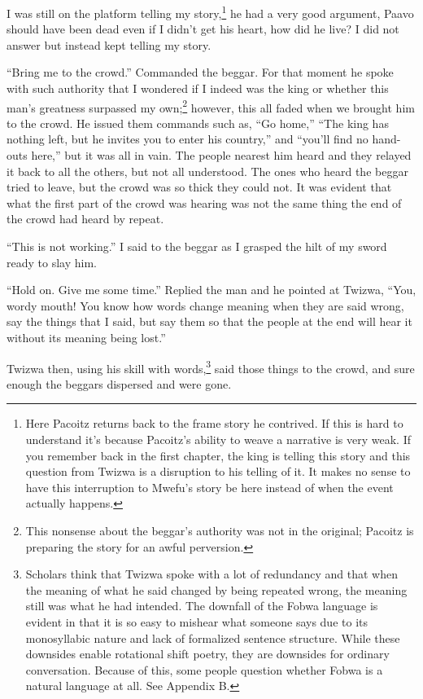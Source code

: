 I was still on the platform telling my story,\footnote{Here Pacoitz returns back to the frame story he contrived. If this is hard to understand it's because Pacoitz's ability to weave a narrative is very weak. If you remember back in the first chapter, the king is telling this story and this question from Twizwa is a disruption to his telling of it. It makes no sense to have this interruption to Mwefu's story be here instead of when the event actually happens.} he had a very good argument, Paavo should have been dead even if I didn't get his heart, how did he live? I did not answer but instead kept telling my story.

\tbreak

``Bring me to the crowd.'' Commanded the beggar. For that moment he spoke with such authority that I wondered if I indeed was the king or whether this man's greatness surpassed my own;\footnote{This nonsense about the beggar's authority was not in the original; Pacoitz is preparing the story for an awful perversion.} however, this all faded when we brought him to the crowd.
He issued them commands such as, ``Go home,'' ``The king has nothing left, but he invites you to enter his country,'' and ``you'll find no hand-outs here,'' but it was all in vain. The people nearest him heard and they relayed it back to all the others, but not all understood. The ones who heard the beggar tried to leave, but the crowd was so thick they could not. It was evident that what the first part of the crowd was hearing was not the same thing the end of the crowd had heard by repeat.

``This is not working.'' I said to the beggar as I grasped the hilt of my sword ready to slay him.

``Hold on. Give me some time.'' Replied the man and he pointed at Twizwa, ``You, wordy mouth! You know how words change meaning when they are said wrong, say the things that I said, but say them so that the people at the end will hear it without its meaning being lost.''

Twizwa then, using his skill with words,\footnote{Scholars think that Twizwa spoke with a lot of redundancy and that when the meaning of what he said changed by being repeated wrong, the meaning still was what he had intended. The downfall of the Fo\-bwa language is evident in that it is so easy to mishear what someone says due to its monosyllabic nature and lack of formalized sentence structure. While these downsides enable rotational shift poetry, they are downsides for ordinary conversation. Because of this, some people question whether Fobwa is a natural language at all. See Appendix B.} said those things to the crowd, and sure enough the beggars dispersed and were gone.

